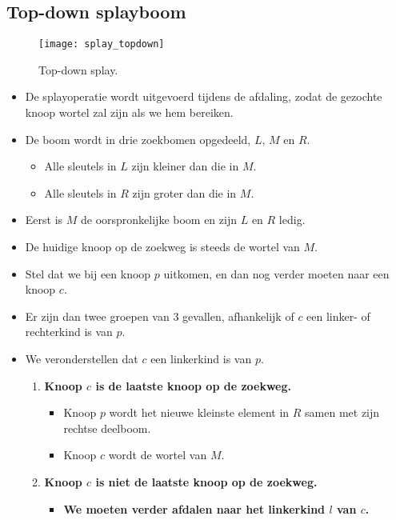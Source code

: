 \subsection{Top-down splayboom}
\begin{figure}[ht]
    \centering
    \texttt{[image: splay\_topdown]}
    \caption{Top-down splay.}
    \label{fig:splay_topdown}

\end{figure}
\begin{itemize}
    \item De splayoperatie wordt uitgevoerd tijdens de afdaling, zodat de gezochte knoop wortel zal zijn als we hem bereiken.
    \item De boom wordt in drie zoekbomen opgedeeld, $L$, $M$ en $R$.
    \begin{itemize}
        \item Alle sleutels in $L$ zijn kleiner dan die in $M$.
        \item Alle sleutels in $R$ zijn groter dan die in $M$.
    \end{itemize}
    \item Eerst is $M$ de oorspronkelijke boom en zijn $L$ en $R$ ledig.
    \item De huidige knoop op de zoekweg is steeds de wortel van $M$.
    \item Stel dat we bij een knoop $p$ uitkomen, en dan nog verder moeten naar een knoop $c$.
    \item Er zijn dan twee groepen van 3 gevallen, afhankelijk of $c$ een linker- of rechterkind is van $p$.
    \item We veronderstellen dat $c$ een linkerkind is van $p$.
    \begin{enumerate}
        \item \textbf{Knoop $c$ is de laatste knoop op de zoekweg.}
        \begin{itemize}
            \item Knoop $p$ wordt het nieuwe kleinste element in $R$ samen met zijn rechtse deelboom.
            \item Knoop $c$ wordt de wortel van $M$.
        \end{itemize}
        \item \textbf{Knoop $c$ is niet de laatste knoop op de zoekweg.}
        \begin{itemize}
            \item \textbf{We moeten verder afdalen naar het linkerkind $l$ van $c$.}
            \begin{itemize}

\end{itemize}
\end{itemize}
\end{enumerate}
\end{itemize}
